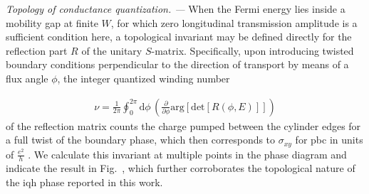 \documentclass[aps,prl,amsmath,amssymb,twocolumn, superscriptaddress]{revtex4-2}
\begin{document}
{\it Topology of conductance quantization. ---} 
When the Fermi energy lies inside a mobility gap at finite $W$, for which zero longitudinal transmission amplitude is a sufficient condition here, a topological invariant may be defined directly for the reflection part $R$ of the unitary $S$-matrix. Specifically, upon introducing twisted boundary conditions perpendicular to the direction of transport by means of a flux angle $\phi$, the integer quantized winding number 

\begin{align}
\nu = \frac{1}{2\pi} \oint_{0}^{2 \pi} \mathrm{d} \phi\, \left(\frac{\partial}{\partial\phi} \mathrm{arg}[\mathrm{det}[R(\phi, E)]] \right) \label{Eqn:W_num}
\end{align}
of the reflection matrix counts the charge pumped between the cylinder edges for a full twist of the boundary phase, which then corresponds to $\sigma_{xy}$ for \gls{pbc} in units of $\frac{e^2}{h}$ \cite{Smatrix_pumping, Smatrix_pumping_2, Scattering_invariants}. We calculate this invariant at multiple points in the phase diagram and indicate the result in Fig.~, which further corroborates the topological nature of the \gls{iqh} phase reported in this work. 
\end{document}

